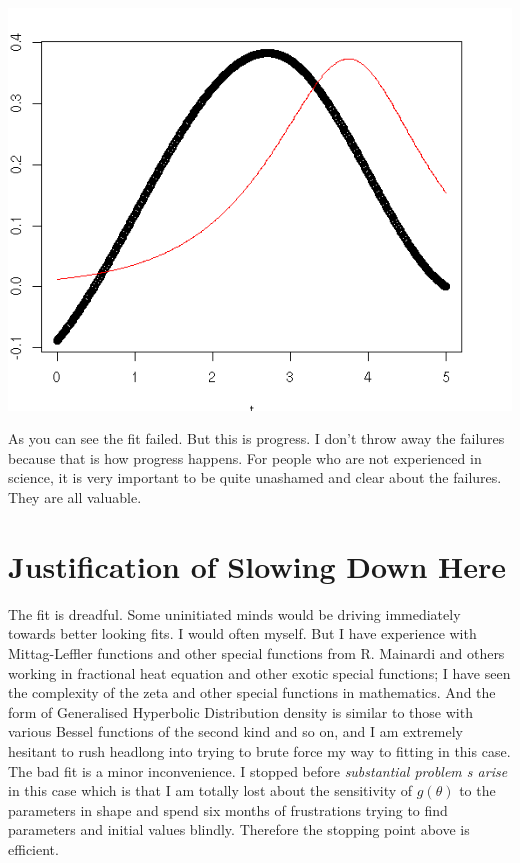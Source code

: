 \documentclass{amsart}
\begin{document}
\includegraphics[scale=0.8]{intfail.png}

As you can see the fit failed.  But this is progress. I don't throw away the failures because that is how progress happens.  For people who are not experienced in science, it is very important to be quite unashamed and clear about the failures.  They are all valuable.  

\section{Justification of Slowing Down Here}

The fit is dreadful.  Some uninitiated minds would be driving immediately towards better looking fits.  I would often myself.  But I have experience with Mittag-Leffler functions and other special functions from R. Mainardi and others working in fractional heat equation and other exotic special functions; I have seen the complexity of the zeta and other special functions in mathematics.  And the form of Generalised Hyperbolic Distribution density is similar to those with various Bessel functions of the second kind and so on, and I am extremely hesitant to rush headlong into trying to brute force my way to fitting in this case.  The bad fit is a minor inconvenience.  I stopped before {\em substantial problem s arise} in this case which is that I am totally lost about the sensitivity of $g(\theta)$ to the parameters in shape and spend six months of frustrations trying to find parameters and initial values blindly.  Therefore the stopping point above is efficient.
\end{document}
